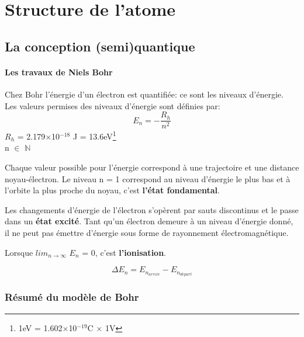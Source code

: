 \documentclass[10pt,a4paper]{book}
\begin{document}
\section{Structure de l'atome}

\subsection{La conception (semi)quantique}

\paragraph{Les travaux de Niels Bohr} Chez Bohr l'énergie d'un électron est quantifiée: ce sont les niveaux d'énergie. \\
Les valeurs permises des niveaux d'énergie sont définies par:
\begin{displaymath}
E_n = - \frac{R_h}{n^2}
\end{displaymath}
$R_h$ = 2.179$\times$10$^{-18}$ J = 13.6eV\footnote{1eV = 1.602$\times$10$^{-19}$C $\times$ 1V}\\
n $\in$ $\mathbb{N}$ \par
Chaque valeur possible pour l'énergie correspond à une trajectoire et une distance noyau-électron. Le niveau n = 1 correspond au niveau d'énergie le plus bas et à l'orbite la plus proche du noyau, c'est \textbf{l'état fondamental}.\par
Les changements d'énergie de l'électron s'opèrent par sauts discontinus et le passe dans un \textbf{état excité}. Tant qu’un électron demeure à un niveau d’énergie donné, il ne peut pas émettre d’énergie sous forme de rayonnement électromagnétique. \par
Lorsque $lim_{n \rightarrow \infty}$ $E_n$ = 0, c'est \textbf{l'ionisation}. \par
\begin{displaymath}
{\Delta}E_n = E_{n_{arriv\acute{e}}} - E_{n_{d\acute{e}part}}
\end{displaymath}

\subsubsection{Résumé du modèle de Bohr}
\end{document}
